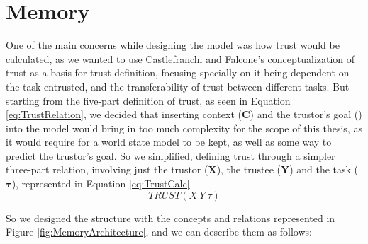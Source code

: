 \section{Memory}
One of the main concerns while designing the model was how trust would be calculated, as we wanted to use Castlefranchi and Falcone's conceptualization of trust \cite{Castelfranchi2010} as a basis for trust definition, focusing specially on it being dependent on the task entrusted, and the transferability of trust between different tasks. But starting from the five-part definition of trust, as seen in Equation \ref{eq:TrustRelation}, we decided that inserting context (\textbf{C}) and the trustor's goal () into the model would bring in too much complexity for the scope of this thesis, as it would require for a world state model to be kept, as well as some way to predict the trustor's goal. So we simplified, defining trust through a simpler three-part relation, involving just the trustor (\textbf{X}), the trustee (\textbf{Y}) and the task ($\bm{\tau}$), represented in Equation \ref{eq:TrustCalc}.
\begin{equation}
TRUST(X\ Y\ \tau)
\label{eq:TrustCalc}
\end{equation}

So we designed the structure with the concepts and relations represented in Figure \ref{fig:MemoryArchitecture}, and we can describe them as follows:

